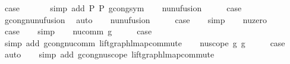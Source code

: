 \begin{isabellebody}
\ {\isacharquery}{\kern0pt}case\isanewline
\ \ \ \ \ \isamarkupfalse%
\ {\isacharparenleft}{\kern0pt}simp\ add{\isacharcolon}{\kern0pt}\ P{}\ P{}\ gcong{\isachardot}{\kern0pt}sym{\isacharparenright}{\kern0pt}\isanewline
{}\isamarkupfalse%
\isanewline
\ \ \isamarkupfalse%
\ nu{\isacharunderscore}{\kern0pt}nu{\isacharunderscore}{\kern0pt}fusion{}\isanewline
\ \ \isamarkupfalse%
\ \isamarkupfalse%
\ {\isacharquery}{\kern0pt}case\isanewline
\ \ \isamarkupfalse%
\ gcong{\isachardot}{\kern0pt}nu{\isacharunderscore}{\kern0pt}nu{\isacharunderscore}{\kern0pt}fusion{}\ \isamarkupfalse%
\ auto\isanewline
{}\isamarkupfalse%
\isanewline
\ \ \isamarkupfalse%
\ nu{\isacharunderscore}{\kern0pt}nu{\isacharunderscore}{\kern0pt}fusion{}\isanewline
\ \ \isamarkupfalse%
\ \isamarkupfalse%
\ {\isacharquery}{\kern0pt}case\isanewline
\ \ \isamarkupfalse%
\ simp\isanewline
{}\isamarkupfalse%
\isanewline
\ \ \isamarkupfalse%
\ nu{\isacharunderscore}{\kern0pt}zero\isanewline
\ \ \isamarkupfalse%
\ \isamarkupfalse%
\ {\isacharquery}{\kern0pt}case\isanewline
\ \ \isamarkupfalse%
\ simp\isanewline
{}\isamarkupfalse%
\isanewline
\ \ \isamarkupfalse%
\ {\isacharparenleft}{\kern0pt}nu{\isacharunderscore}{\kern0pt}comm\ g{\isacharparenright}{\kern0pt}\isanewline
\ \ \isamarkupfalse%
\ \isamarkupfalse%
\ {\isacharquery}{\kern0pt}case\isanewline
\ \ \isamarkupfalse%
\ {\isacharparenleft}{\kern0pt}simp\ add{\isacharcolon}{\kern0pt}\ gcong{\isachardot}{\kern0pt}nu{\isacharunderscore}{\kern0pt}comm\ lift{\isacharunderscore}{\kern0pt}graph{\isacharunderscore}{\kern0pt}lmap{\isacharunderscore}{\kern0pt}commute{\isacharparenright}{\kern0pt}\isanewline
{}\isamarkupfalse%
\isanewline
\ \ \isamarkupfalse%
\ {\isacharparenleft}{\kern0pt}nu{\isacharunderscore}{\kern0pt}scope\ g{}\ g{}{\isacharparenright}{\kern0pt}\isanewline
\ \ \isamarkupfalse%
\ \isamarkupfalse%
\ {\isacharquery}{\kern0pt}case\isanewline
\ \ \isamarkupfalse%
\ auto\isanewline
\ \ \isamarkupfalse%
\ {\isacharparenleft}{\kern0pt}simp\ add{\isacharcolon}{\kern0pt}\ gcong{\isachardot}{\kern0pt}nu{\isacharunderscore}{\kern0pt}scope\ lift{\isacharunderscore}{\kern0pt}graph{\isacharunderscore}{\kern0pt}lmap{\isacharunderscore}{\kern0pt}commute{\isacharparenright}{\kern0pt}\isanewline

\end{isabellebody}
